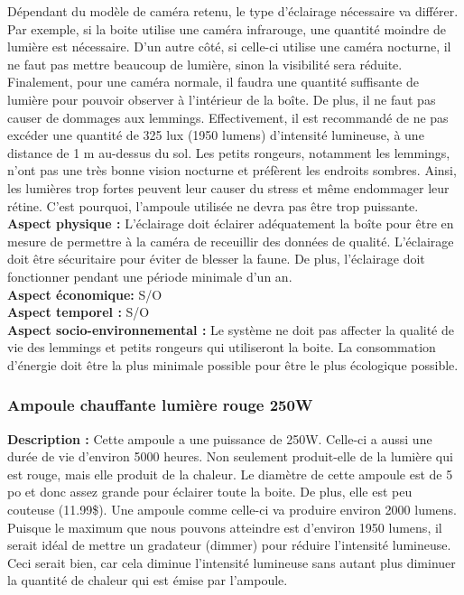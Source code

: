 Dépendant du modèle de caméra retenu, le type d’éclairage nécessaire va
différer. Par exemple, si la boite utilise une caméra infrarouge, une quantité
moindre de lumière est nécessaire. D’un autre côté, si celle-ci utilise une
caméra nocturne, il ne faut pas mettre beaucoup de lumière, sinon la visibilité
sera réduite. Finalement, pour une caméra normale, il faudra une quantité
suffisante de lumière pour pouvoir observer à l’intérieur de la boîte. De plus,
il ne faut pas causer de dommages aux lemmings. Effectivement, il est
recommandé de ne pas excéder une quantité de 325 lux (1950 lumens) d’intensité
lumineuse, à une distance de 1 m au-dessus du sol. Les petits rongeurs,
notamment les lemmings, n’ont pas une très bonne vision nocturne et préfèrent
les endroits sombres. Ainsi, les lumières trop fortes peuvent leur causer du
stress et même endommager leur rétine. C’est pourquoi, l’ampoule utilisée ne
devra pas être trop puissante. \\

\noindent
\textbf{Aspect physique :} L’éclairage doit éclairer
adéquatement la boîte pour être en mesure de permettre à la caméra de
receuillir des données de qualité. L’éclairage doit être sécuritaire pour
éviter de blesser la faune. De plus, l’éclairage doit fonctionner pendant une
période minimale d’un an. \\
\textbf{Aspect économique:} S/O \\
\textbf{Aspect temporel :} S/O \\
\textbf{Aspect socio-environnemental :} Le système ne doit pas affecter la qualité de vie des
lemmings et petits rongeurs qui utiliseront la boite. La consommation d’énergie
doit être la plus minimale possible pour être le plus écologique possible.

\subsubsection{Ampoule chauffante lumière rouge 250W}

\noindent
\textbf{Description :} Cette ampoule a une puissance de 250W. Celle-ci a aussi une durée
de vie d’environ 5000 heures. Non seulement produit-elle de la lumière qui est
rouge, mais elle produit de la chaleur. Le diamètre de cette ampoule est de 5
po et donc assez grande pour éclairer toute la boite. De plus, elle est peu
couteuse (11.99\$). Une ampoule comme celle-ci va produire environ 2000 lumens.
Puisque le maximum que nous pouvons atteindre est d’environ 1950 lumens, il
serait idéal de mettre un gradateur (dimmer) pour réduire l’intensité
lumineuse. Ceci serait bien, car cela diminue l’intensité lumineuse sans autant
plus diminuer la quantité de chaleur qui est émise par l’ampoule. \\

